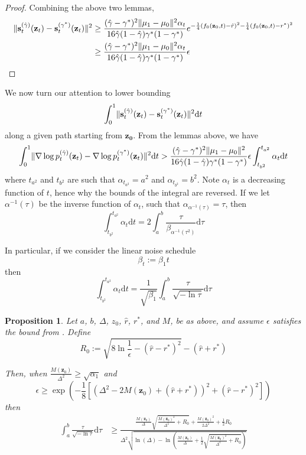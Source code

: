 \documentclass[11pt]{article}
\newcommand{\fitparenth}[1]{\left(#1\right)}
\newcommand{\fitbracket}[1]{\left[#1\right]}
\newcommand{\vect}[1]{\mathbf{#1}}
\theoremstyle{plain}
\newtheorem{proposition}[theorem]{Proposition}
\newcommand{\1}{\mathbbm{1}}
\DeclarePairedDelimiter{\norm}{\lVert}{\rVert}
\newcommand{\pdist}[2][]{p_{#1}^{(#2)}}
\newcommand{\score}[2][]{\vect{s}_{#1}^{(#2)}}
\newcommand{\separation}{\Delta}
\begin{document}
\begin{appendices}
\begin{proof}
    Combining the above two lemmas,
    \begin{align*}
        \norm{\score[t]{\hat \gamma}(\vect z_t) - \score[t]{\gamma^{*}}(\vect z_t)}^2 &\geq\frac{(\hat \gamma-\gamma^*)^2\norm{ \mu_1- \mu_0}^2 \alpha_t}{16 \hat \gamma (1-\hat \gamma) \gamma^* (1-\gamma^*)}e^{-\frac{1}{4}\fitparenth{f_0(\vect z_0,t)-\hat r}^2-\frac{1}{4}\fitparenth{f_0(\vect z_0,t)-r^*}^2}
        \\
        &\geq\frac{(\hat \gamma-\gamma^*)^2\norm{ \mu_1- \mu_0}^2 \alpha_t}{16 \hat \gamma (1-\hat \gamma) \gamma^* (1-\gamma^*)}\epsilon
    \end{align*}
\end{proof}

We now turn our attention to lower bounding 
\[\int_0^1\norm{\score[t]{\hat \gamma}(\vect z_t) - \score[t]{\gamma^{*}}(\vect z_t)}^2\mathrm{d}t\]
along a given path starting from $\vect {z _ 0} $. From the lemmas above, we have
\[\int_0^1  \norm{\nabla \log \pdist[t]{\hat \gamma}(\vect z_t) - \nabla \log \pdist[t]{\gamma^{*}}(\vect z_t)}^2\mathrm{d}t > \frac{({\hat \gamma}-\gamma^*)^2\norm{ \mu_1- \mu_0}^2}{16{\hat \gamma}(1-{\hat \gamma}) \gamma^* (1-\gamma^*)}\epsilon\int_{t_{b^2}}^{t_{a^2}}\alpha_t\mathrm{d}t\] 
where $t_{a^2}$ and $t_{b^2}$ are such that $\alpha_{t_{a^2}}={a^2}$ and $\alpha_{t_{b^2}}={b^2}$. Note $\alpha_t$ is a decreasing function of $t$, hence why the bounds of the integral are reversed.  If we let $\alpha^{-1}(\tau)$ be the inverse function of $\alpha_t$, such that $\alpha_{\alpha^{-1}(\tau)} = \tau$, then
\[\int_{t_{b^2}}^{t_{a^2}}\alpha_t\mathrm{d}t=2\int_{a}^b \frac{\tau}{\beta_{\alpha^{-1}(\tau^2)}}\mathrm{d}\tau\]

In particular, if we consider the linear noise schedule 
\[\beta_t:=\beta_1 t\]
then
\[\int_{t_{b^2}}^{t_{a^2}}\alpha_t\mathrm{d}t=\frac{1}{\sqrt{\beta_1}}\int_{a}^b \frac{\tau}{\sqrt{-\ln \tau}}\mathrm{d}\tau\]

\begin{proposition}\label{prop: Lower bound integral}
    Let $a$, $b$, $\separation$, $z_0$, $\hat r$, $r^*$, and $M$, be as above, and assume $\epsilon$ satisfies the bound from . Define 
    \[R_0:=\sqrt{8\ln \frac{1}{\epsilon}-(\hat r-r^*)^2}-(\hat r+r^*)\]
    
    Then, when $\frac{M(\vect z_0)}{\separation^2}\geq \sqrt{\alpha_1}$ and
    \[\epsilon \geq \exp\fitparenth{-\frac{1}{8}\fitbracket{(\separation^2 - 2M(\vect z_0)+(\hat r+r^*))^2 + (\hat r-r^*)^2}}\]
    then
    \begin{align*}
        \int_{a}^b \frac{\tau}{\sqrt{-\ln \tau}}\mathrm{d}\tau&\geq \frac{\frac{M(\vect z_0)}{\separation}\sqrt{\frac{M(\vect z_0)^2}{\separation^2} + R_0}+\frac{M(\vect z_0)^2}{2\separation^2} + \frac{1}{2}R_0}{\separation^2\sqrt{\ln(\separation)- \ln\fitparenth{\frac{M(\vect z_0)}{\separation}+ \frac{1}{2}\sqrt{\frac{M(\vect z_0)^2}{\separation^2} + R_0}}}}
    \end{align*}
\end{proposition}


\end{appendices}
\end{document}
